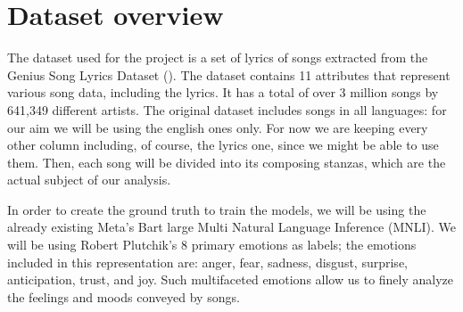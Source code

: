 \chapter{Dataset overview}
\label{ch:capitolo1}

The dataset used for the project is a set of lyrics of songs extracted
from the Genius Song Lyrics Dataset (\cite{geniusdataset}).
The dataset contains 11 attributes
that represent various song data, including the lyrics. It
has a total of over 3 million songs by 641,349 different artists.
The original dataset includes songs in all languages: for our aim
we will be using the english ones only. For now we are keeping
every other column including, of course, the lyrics one, since
we might be able to use them. Then, each song will be divided
into its composing stanzas, which are the actual subject of our analysis. 

In order to create the ground truth to train the models, we will be
using the already existing Meta's Bart large Multi Natural Language
Inference (MNLI). We will be using Robert Plutchik's 8 primary emotions
as labels; the emotions included in this representation are:
anger, fear, sadness, disgust, surprise, anticipation, trust, and joy.
Such multifaceted emotions allow us to finely analyze the feelings and
moods conveyed by songs.